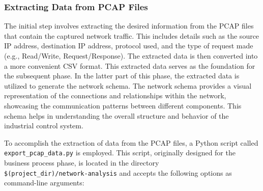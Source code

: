 \subsubsection{Extracting Data from PCAP Files}
\label{subsubsec:4_extract_pcap}
The initial step involves extracting the desired information from the PCAP files that contain the captured network traffic. This includes details such as the source IP address, destination IP address, protocol used, and the type of request made (e.g., Read/Write, Request/Response). The extracted data is then converted into a more convenient CSV format. This extracted data serves as the foundation for the subsequent phase.\newline
In the latter part of this phase, the extracted data is utilized to generate the network schema. The network schema provides a visual representation of the connections and relationships within the network, showcasing the communication patterns between different components. This schema helps in understanding the overall structure and behavior of the industrial control system.

\bigskip
To accomplish the extraction of data from the PCAP files, a Python script called \texttt{export\_pcap\_data.py} is employed. This script, originally designed for the business process phase, is located in the directory\\ \texttt{\$(project\_dir)/network-analysis} and accepts the following options as command-line arguments:

